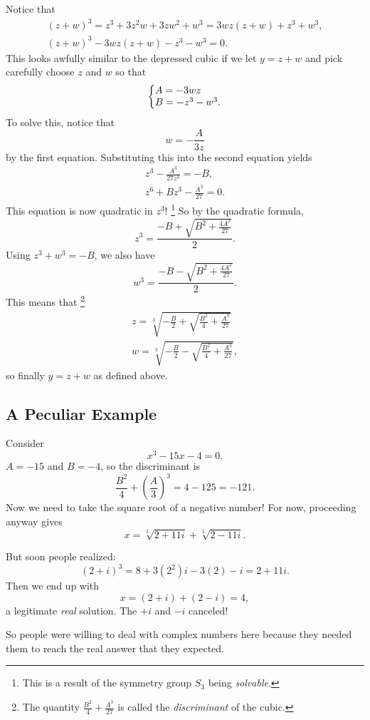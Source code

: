 Notice that
\begin{gather*}
  (z + w)^3 = z^3 + 3z^2w + 3zw^2 + w^3 = 3wz(z + w) + z^3 + w^3, \\
  (z + w)^3 - 3wz(z + w) - z^3 - w^3 = 0.
\end{gather*}
This looks awfully similar to the depressed cubic if
we let $y = z + w$ and pick carefully choose $z$ and $w$
so that
\[
\left\{\begin{array}{@{}l@{}}
  A = -3wz \\
  B = -z^3 - w^3.
\end{array}\right.
\] 
To solve this, notice that
\[w = -\frac{A}{3z}\]
by the first equation. Substituting this into the second
equation yields
\begin{gather*}
  z^3 - \frac{A^3}{27z^3} = -B, \\
  z^6 + Bz^3 - \frac{A^3}{27} = 0.
\end{gather*}
This equation is now quadratic in $z^3$!
\footnote{This is a result of the symmetry group $S_3$ being \textit{solvable}.}
So by the quadratic formula,
\[
  z^3 = \frac{-B + \sqrt{B^2 + \frac{4A^3}{27}}}{2}
.\] 
Using $z^3 + w^3 = -B$, we also have
\[
  w^3 = \frac{-B - \sqrt{B^2 + \frac{4A^3}{27}}}{2}
.\] 
This means that
\footnote{The quantity $\frac{B^2}{4} + \frac{A^3}{27}$ is called the \textit{discriminant} of the cubic.}
\begin{gather*}
  z = \sqrt[3]{-\frac{B}{2} + \sqrt{\frac{B^2}{4} + \frac{A^3}{27}}} \\
  w = \sqrt[3]{-\frac{B}{2} - \sqrt{\frac{B^2}{4} + \frac{A^3}{27}}},
\end{gather*}
so finally $y = z + w$ as defined above.

\subsection{A Peculiar Example}
Consider
\[x^3 - 15x - 4 = 0.\]
$A = -15$ and $B = -4$, so the discriminant is
 \[
\frac{B^2}{4} + \left(\frac{A}{3}\right)^3 = 4 - 125 = -121
.\]
Now we need to take the square root of a negative
number! For now, proceeding anyway gives
\[
x = \sqrt[3]{2 + 11i} + \sqrt[3]{2 - 11i}
.\] 

But soon people realized:
\[
  (2 + i)^3 = 8 + 3(2^2)i - 3(2) - i = 2 + 11i
.\] 
Then we end up with
\[x = (2 + i) + (2 - i) = 4,\]
a legitimate \textit{real} solution. The $+i$ and $-i$
canceled!

So people were willing to deal with complex
numbers here because they needed them to reach the real
answer that they expected.

